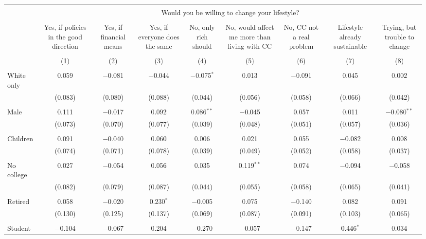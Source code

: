 
\begin{tabular}{@{\extracolsep{5pt}}lcccccccc} 
\\[-1.8ex]\hline 
\hline \\[-1.8ex] 
 & \multicolumn{8}{c}{Would you be willing to change your lifestyle?} \\ 
\cline{2-9} 
\\[-1.8ex] & Yes, if policies in the good direction & Yes, if financial means & Yes, if everyone does the same & No, only rich should & No, would affect me more than living with CC & No, CC not a real problem & Lifestyle already sustainable & Trying, but trouble to change \\ 
\\[-1.8ex] & (1) & (2) & (3) & (4) & (5) & (6) & (7) & (8)\\ 
\hline \\[-1.8ex] 
 White only & 0.059 & $-$0.081 & $-$0.044 & $-$0.075$^{*}$ & 0.013 & $-$0.091 & 0.045 & 0.002 \\ 
  & (0.083) & (0.080) & (0.088) & (0.044) & (0.056) & (0.058) & (0.066) & (0.042) \\ 
  & & & & & & & & \\ 
 Male & 0.111 & $-$0.017 & 0.092 & 0.086$^{**}$ & $-$0.045 & 0.057 & 0.011 & $-$0.080$^{**}$ \\ 
  & (0.073) & (0.070) & (0.077) & (0.039) & (0.048) & (0.051) & (0.057) & (0.036) \\ 
  & & & & & & & & \\ 
 Children & 0.091 & $-$0.040 & 0.060 & 0.006 & 0.021 & 0.055 & $-$0.082 & 0.008 \\ 
  & (0.074) & (0.071) & (0.078) & (0.039) & (0.049) & (0.052) & (0.058) & (0.037) \\ 
  & & & & & & & & \\ 
 No college & 0.027 & $-$0.054 & 0.056 & 0.035 & 0.119$^{**}$ & 0.074 & $-$0.094 & $-$0.058 \\ 
  & (0.082) & (0.079) & (0.087) & (0.044) & (0.055) & (0.058) & (0.065) & (0.041) \\ 
  & & & & & & & & \\ 
 Retired & 0.058 & $-$0.020 & 0.230$^{*}$ & $-$0.005 & 0.075 & $-$0.140 & 0.082 & 0.091 \\ 
  & (0.130) & (0.125) & (0.137) & (0.069) & (0.087) & (0.091) & (0.103) & (0.065) \\ 
  & & & & & & & & \\ 
 Student & $-$0.104 & $-$0.067 & 0.204 & $-$0.270 & $-$0.057 & $-$0.147 & 0.446$^{*}$ & 0.034 \\ 

\end{tabular}
